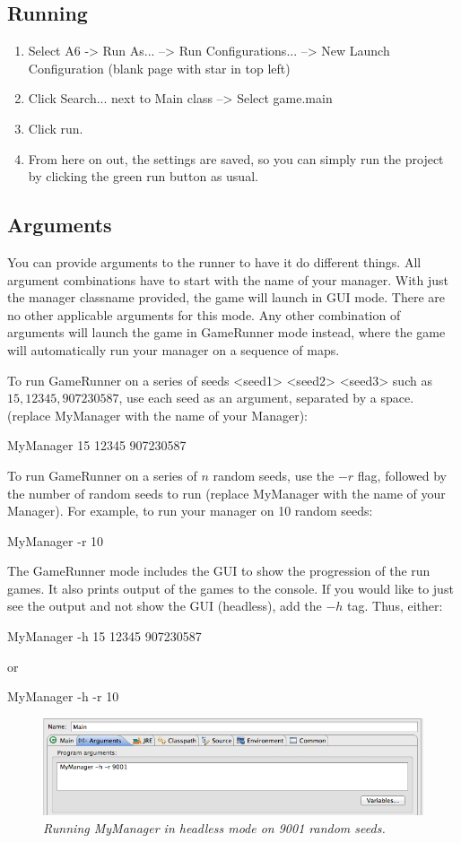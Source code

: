 \documentclass[11pt]{article}
\begin{document}
\subsection{Running}
\begin{enumerate}
\item Select A6 -> Run As... --> Run Configurations... --> New Launch Configuration (blank page with star in top left)
\item Click Search... next to Main class --> Select game.main
\item Click run.
\item From here on out, the settings are saved, so you can simply run the project by clicking the green run button as usual.
\end{enumerate}

\subsection{Arguments}
You can provide arguments to the runner to have it do different things. All argument combinations have to start with the name of your manager. With just the manager classname provided, the game will launch in GUI mode. There are no other applicable arguments for this mode. Any other combination of arguments will launch the game in GameRunner mode instead, where the game will automatically run your manager on a sequence of maps. 

To run GameRunner on a series of seeds <seed1> <seed2> <seed3> such as $15, 12345, 907230587$, use each seed as an argument, separated by a space. (replace MyManager with the name of your Manager):
\begin{center}
MyManager 15 12345 907230587
\end{center}
To run GameRunner on a series of $n$ random seeds, use the $-r$ flag, followed by the number of random seeds to run (replace MyManager with the name of your Manager). For example, to run your manager on 10 random seeds:
\begin{center}
MyManager -r 10
\end{center}
The GameRunner mode includes the GUI to show the progression of the run games. It also prints output of the games to the console. If you would like to just see the output and not show the GUI (headless), add the $-h$ tag. Thus, either:
\begin{center}
MyManager -h 15 12345 907230587
\end{center}
or
\begin{center}
MyManager -h -r 10
\end{center}
\begin{figure}[h]
\centerline{\includegraphics[scale=0.65]{args.png}} 
\caption{\em{Running MyManager in headless mode on 9001 random seeds.}}
\end{figure}
\end{document}
